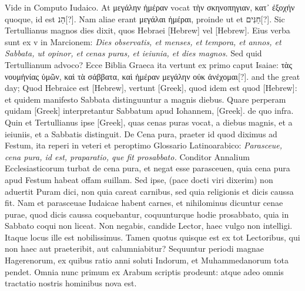 \begin{parnumbers}
Vide in Computo Iudaico.
\lnr{}At \textgreek{μεγάλην ἡμέραν}
 vocat \textgreek{τὴν σκηνοπηγιαν, κατ᾽ ἐξοχήν}
 quoque, id est \texthebrew{הַנ}[?].
\lnr{}Nam aliae erant \textgreek{μεγάλαι ἡμέραι},
proinde ut et \texthebrew{חַנִּים}[?].
\lnr{}Sic Tertullianus magnos dies dixit, quos
Hebraei \texthebrew{[Hebrew]} vel \texthebrew{[Hebrew]}.
\lnr{}Eius verba sunt ex v in Marcionem:
\textit{Dies observatis, et menses, et tempora, et annos, et Sabbata, ut opinor,
et cenas puras, et ieiunia, et dies magnos.}
\lnr{}Sed quid Tertullianum
advoco?
\lnr{}Ecce Biblia Graeca ita vertunt ex primo caput Isaiae:
\textgreek{τὰς νουμἠνίας ὑμῶν, καὶ τὰ σάββατα,
 καὶ ἡμέραν μεγάλην οὐκ ἀνέχομαι}[?].
 and the great day;
\lnr{}Quod Hebraice est \texthebrew{[Hebrew]}, vertunt \textgreek{[Greek]}, quod idem
est quod \texthebrew{[Hebrew]}: et quidem manifesto Sabbata distinguuntur a
magnis diebus. 
\lnr{}Quare perperam quidam \textgreek{[Greek]} interpretantur
Sabbatum apud Iohannem, \textgreek{[Greek]}. de quo infra.
\lnr{}Quin et Tertullianus ipse \textgreek{[Greek]},
quas cenas puras vocat, a diebus magnis, et a ieiuniis, et a
Sabbatis distinguit.
\lnr{}De Cena pura, praeter id quod diximus ad
Festum, ita reperi in veteri et peroptimo Glossario Latinoarabico:
\textit{Parasceue, cena pura, id est, praparatio, que fit prosabbato.}
\lnr{}Conditor Annalium Ecclesiasticorum turbat de cena
pura, et negat esse parasceuen, quia cena pura apud Festum
habeat offam suillam.
\lnr{}Sed ipse, (pace docti viri dixerim) non
aduertit Puram dici, non quia careat carnibus, sed quia religionis
et dicis caussa fit.
\lnr{}Nam et parasceuae Iudaicae habent carnes,
et nihilominus dicuntur cenae purae, quod dicis caussa coquebantur,
coquunturque hodie prosabbato, quia in Sabbato
coqui non liceat.
\lnr{}Non negabis, candide Lector, haec vulgo non intelligi.
\lnr{}Itaque locus ille est nobilissimus. 
\lnr{}Tamen quotus quisque est ex tot Lectoribus, qui non haec aut praeteribit,
aut calumniabitur?
\lnr{}Sequuntur periodi magnae Hagerenorum,
ex quibus ratio anni soluti Indorum, et Muhammedanorum
tota pendet.
\lnr{}Omnia nunc primum ex Arabum scriptis
prodeunt: atque adeo omnis tractatio nostris hominibus
nova est.


\end{parnumbers}
